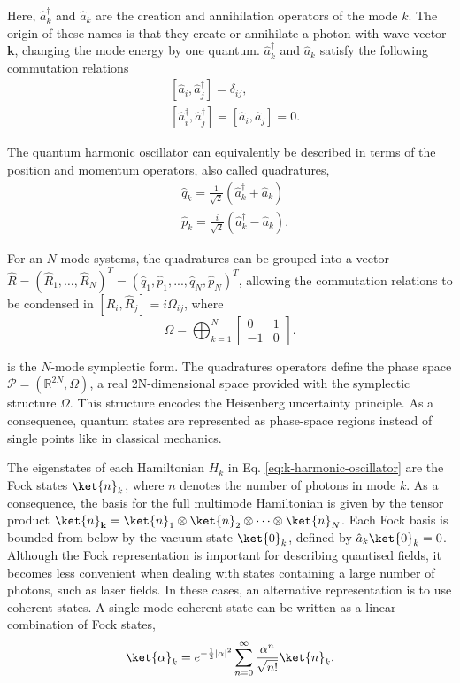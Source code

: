 \noindent Here, $\hat{a}_k^\dagger$ and $\hat{a}_k$ are the creation and annihilation operators of the mode $k$. The origin of these names is that they create or annihilate a photon with wave vector $\mathbf{k}$, changing the mode energy by one quantum. $\hat{a}_k^\dagger$ and $\hat{a}_k$ satisfy the following commutation relations
\begin{align}
    &[\hat{a}_i, \hat{a}_j^\dagger] = \delta_{ij},\\
    &[\hat{a}_i^\dagger, \hat{a}_j^\dagger] = [\hat{a}_i, \hat{a}_j] = 0.
\end{align}

\noindent The quantum harmonic oscillator can equivalently be described in terms of the position and momentum operators, also called quadratures,
\begin{align}
    &\hat{q}_k = \frac{1}{\sqrt{2}} (\hat{a}_k^\dagger + \hat{a}_k)\\
    &\hat{p}_k = \frac{i}{\sqrt{2}} (\hat{a}_k^\dagger - \hat{a}_k).
\end{align}

\noindent For an $N$-mode systems, the quadratures can be grouped into a vector $\hat{R} = (\hat{R}_1, \dots, \hat{R}_N)^T = (\hat{q}_1, \hat{p}_1, ..., \hat{q}_N, \hat{p}_N)^T$, allowing the commutation relations to be condensed in $[\hat{R}_i, \hat{R}_j] = i \Omega_{ij}$, where
\begin{equation}
    \Omega = \bigoplus_{k = 1}^{N}
    \begin{bmatrix}
        0 & 1\\
        -1 & 0
    \end{bmatrix}.
\end{equation}

\noindent is the $N$-mode symplectic form. The quadratures operators define the phase space $\mathcal{P} = (\mathbb{R}^{2N} , \Omega)$, a real 2N-dimensional space provided with the symplectic structure $\Omega$. This structure encodes the Heisenberg uncertainty principle. As a consequence, quantum states are represented as phase-space regions instead of single points like in classical mechanics.

The eigenstates of each Hamiltonian $H_k$ in Eq. \eqref{eq:k-harmonic-oscillator} are the Fock states $\ket{n}_k$, where $n$ denotes the number of photons in mode $k$. As a consequence, the basis for the full multimode Hamiltonian is given by the tensor product $\ket{n}_\mathbf{k} = \ket{n}_1 \otimes \ket{n}_2 \otimes \dots \otimes \ket{n}_N$. Each Fock basis is bounded from below by the vacuum state $\ket{0}_k$, defined by $\hat{a}_k \ket{0}_k = 0$. Although the Fock representation is important for describing quantised fields, it becomes less convenient when dealing with states containing a large number of photons, such as laser fields. In these cases, an alternative representation is to use coherent states. A single-mode coherent state can be written as a linear combination of Fock states,
\begin{equation}
    \ket{\alpha}_k = e^{-\frac{1}{2}|\alpha|^2} \sum_{n=0}^{\infty} \frac{\alpha^n}{\sqrt{n!}} \ket{n}_k.
\end{equation}

